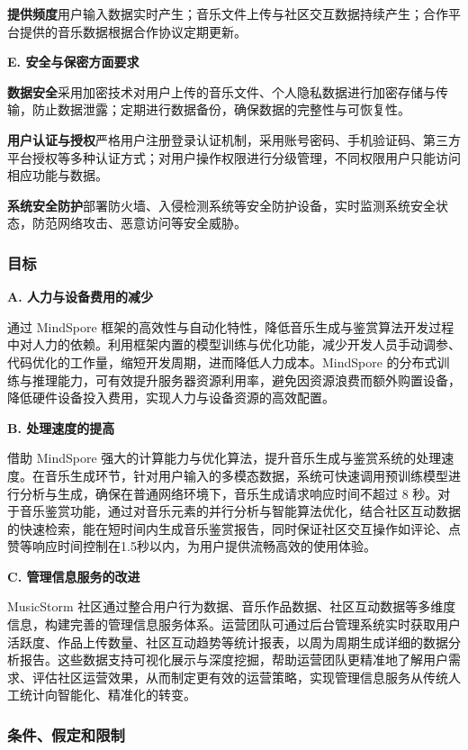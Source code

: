 \documentclass{base}
\numberwithin{figure}{section} %
\begin{document}
\textbf{提供频度}\quad 用户输入数据实时产生；音乐文件上传与社区交互数据持续产生；合作平台提供的音乐数据根据合作协议定期更新。

\textbf{E. 安全与保密方面要求}

\textbf{数据安全}\quad 采用加密技术对用户上传的音乐文件、个人隐私数据进行加密存储与传输，防止数据泄露；定期进行数据备份，确保数据的完整性与可恢复性。​

\textbf{用户认证与授权}\quad 严格用户注册登录认证机制，采用账号密码、手机验证码、第三方平台授权等多种认证方式；对用户操作权限进行分级管理，不同权限用户只能访问相应功能与数据。​

\textbf{系统安全防护}\quad 部署防火墙、入侵检测系统等安全防护设备，实时监测系统安全状态，防范网络攻击、恶意访问等安全威胁。

\subsubsection{目标}

\textbf{A. 人力与设备费用的减少}

通过 MindSpore 框架的高效性与自动化特性，降低音乐生成与鉴赏算法开发过程中对人力的依赖。利用框架内置的模型训练与优化功能，减少开发人员手动调参、代码优化的工作量，缩短开发周期，进而降低人力成本。MindSpore 的分布式训练与推理能力，可有效提升服务器资源利用率，避免因资源浪费而额外购置设备，降低硬件设备投入费用，实现人力与设备资源的高效配置。

\textbf{B. 处理速度的提高}

借助 MindSpore 强大的计算能力与优化算法，提升音乐生成与鉴赏系统的处理速度。在音乐生成环节，针对用户输入的多模态数据，系统可快速调用预训练模型进行分析与生成，确保在普通网络环境下，音乐生成请求响应时间不超过 8 秒。对于音乐鉴赏功能，通过对音乐元素的并行分析与智能算法优化，结合社区互动数据的快速检索，能在短时间内生成音乐鉴赏报告，同时保证社区交互操作如评论、点赞等响应时间控制在1.5秒以内，为用户提供流畅高效的使用体验。

\textbf{C. 管理信息服务的改进}

MusicStorm 社区通过整合用户行为数据、音乐作品数据、社区互动数据等多维度信息，构建完善的管理信息服务体系。运营团队可通过后台管理系统实时获取用户活跃度、作品上传数量、社区互动趋势等统计报表，以周为周期生成详细的数据分析报告。这些数据支持可视化展示与深度挖掘，帮助运营团队更精准地了解用户需求、评估社区运营效果，从而制定更有效的运营策略，实现管理信息服务从传统人工统计向智能化、精准化的转变。

\subsubsection{条件、假定和限制}
\end{document}
